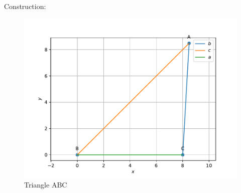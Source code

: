 \documentclass{article}
\begin{document}
Construction: \\
\begin{figure}[h]
 \begin{center}
	 \includegraphics[width=\columnwidth]{chapters/9/11/2/2-new/figs/triangle.pdf}
 \end{center}
 \caption{Triangle ABC}
 \label{fig:chapters/9/11/2/2-new/triangle}
\end{figure}
\end{document}
